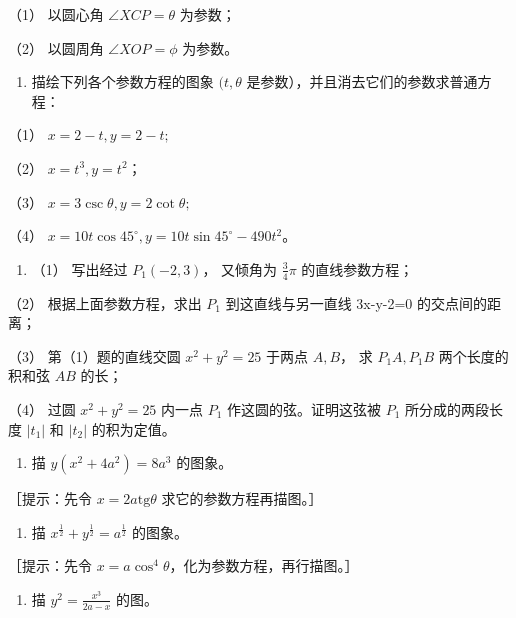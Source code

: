 （1） 以圆心角 \(\angle XCP = \theta\) 为参数；

（2） 以圆周角 \(\angle XOP = \phi\) 为参数。

\begin{enumerate}
\def\labelenumi{\arabic{enumi}.}
\tightlist
\item
  描绘下列各个参数方程的图象 \((t, \theta\)
  是参数），并且消去它们的参数求普通方程：
\end{enumerate}

（1） \(x = 2 - t, y = 2 - t;\)

（2） \(x = t^3, y = t^2\)；

（3） \(x = 3\csc \theta, y = 2\cot \theta;\)

（4） \(x = 10t\cos 45^{\circ}, y = 10t\sin 45^{\circ} - 490t^{2}\)。

\begin{enumerate}
\def\labelenumi{\arabic{enumi}.}
\setcounter{enumi}{1}
\tightlist
\item
  （1） 写出经过 \(P_{1}(-2,3)\)， 又倾角为 \(\frac{3}{4}\pi\)
  的直线参数方程；
\end{enumerate}

（2） 根据上面参数方程，求出 \(P_{1}\) 到这直线与另一直线 3x-y-2=0
的交点间的距离；

（3） 第（1）题的直线交圆 \(x^{2} + y^{2} = 25\) 于两点 \(A, B\)， 求
\(P_{1}A, P_{1}B\) 两个长度的积和弦 \(AB\) 的长；

（4） 过圆 \(x^{2} + y^{2} = 25\) 内一点 \(P_{1}\)
作这圆的弦。证明这弦被 \(P_{1}\) 所分成的两段长度 \(|t_{1}|\) 和
\(|t_{2}|\) 的积为定值。

\begin{enumerate}
\def\labelenumi{\arabic{enumi}.}
\setcounter{enumi}{2}
\tightlist
\item
  描 \(y(x^{2} + 4a^{2}) = 8a^{3}\) 的图象。
\end{enumerate}

［提示：先令 \(x = 2a\mathrm{tg}\theta\) 求它的参数方程再描图。］

\begin{enumerate}
\def\labelenumi{\arabic{enumi}.}
\setcounter{enumi}{3}
\tightlist
\item
  描 \(x^{\frac{1}{2}} + y^{\frac{1}{2}} = a^{\frac{1}{2}}\) 的图象。
\end{enumerate}

［提示：先令 \(x = a\cos^4\theta\)，化为参数方程，再行描图。］

\begin{enumerate}
\def\labelenumi{\arabic{enumi}.}
\setcounter{enumi}{4}
\tightlist
\item
  描 \(y^{2} = \frac{x^{3}}{2a - x}\) 的图。
\end{enumerate}

